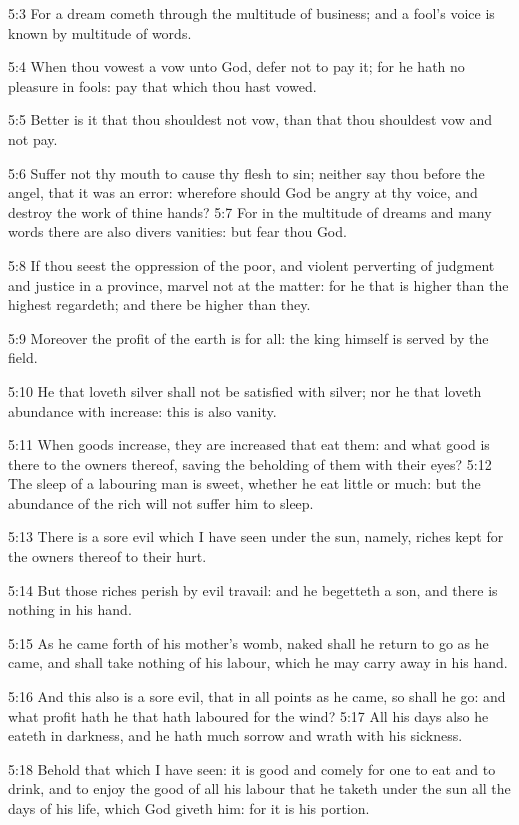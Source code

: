 5:3 For a dream cometh through the multitude of business; and a fool's
voice is known by multitude of words.

5:4 When thou vowest a vow unto God, defer not to pay it; for he hath
no pleasure in fools: pay that which thou hast vowed.

5:5 Better is it that thou shouldest not vow, than that thou shouldest
vow and not pay.

5:6 Suffer not thy mouth to cause thy flesh to sin; neither say thou
before the angel, that it was an error: wherefore should God be angry
at thy voice, and destroy the work of thine hands?  5:7 For in the
multitude of dreams and many words there are also divers vanities: but
fear thou God.

5:8 If thou seest the oppression of the poor, and violent perverting
of judgment and justice in a province, marvel not at the matter: for
he that is higher than the highest regardeth; and there be higher than
they.

5:9 Moreover the profit of the earth is for all: the king himself is
served by the field.

5:10 He that loveth silver shall not be satisfied with silver; nor he
that loveth abundance with increase: this is also vanity.

5:11 When goods increase, they are increased that eat them: and what
good is there to the owners thereof, saving the beholding of them with
their eyes?  5:12 The sleep of a labouring man is sweet, whether he
eat little or much: but the abundance of the rich will not suffer him
to sleep.

5:13 There is a sore evil which I have seen under the sun, namely,
riches kept for the owners thereof to their hurt.

5:14 But those riches perish by evil travail: and he begetteth a son,
and there is nothing in his hand.

5:15 As he came forth of his mother's womb, naked shall he return to
go as he came, and shall take nothing of his labour, which he may
carry away in his hand.

5:16 And this also is a sore evil, that in all points as he came, so
shall he go: and what profit hath he that hath laboured for the wind?
5:17 All his days also he eateth in darkness, and he hath much sorrow
and wrath with his sickness.

5:18 Behold that which I have seen: it is good and comely for one to
eat and to drink, and to enjoy the good of all his labour that he
taketh under the sun all the days of his life, which God giveth him:
for it is his portion.

